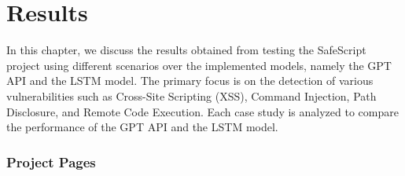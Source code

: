 \chapter{Results}\label{chap:results}

In this chapter, we discuss the results obtained from testing the SafeScript project using different scenarios over the implemented models, namely the GPT API and the LSTM model. 
The primary focus is on the detection of various vulnerabilities such as Cross-Site Scripting (XSS), Command Injection, Path Disclosure, and Remote Code Execution. 
Each case study is analyzed to compare the performance of the GPT API and the LSTM model.

\subsection{Project Pages}

